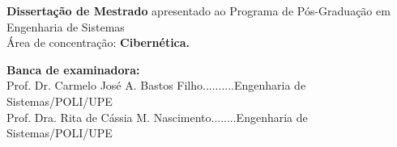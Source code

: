 \begin{center}
\begin{center}
\end{center}


\begin{flushright}
\vspace{0.5in}
\parbox{3.15in}
 {\textbf{Dissertação de Mestrado} apresentado ao Programa de Pós-Graduação em Engenharia de Sistemas\\
 Área de concentração: \textbf{Cibernética.} }
\end{flushright}



\vspace{0.5in}

\begin{flushleft}

\vspace{1ex} \textbf{Banca de examinadora:} \\

\vspace{1ex} Prof. Dr.  Carmelo José A. Bastos Filho..........Engenharia de Sistemas/POLI/UPE \\
\vspace{1ex} Prof. Dra. Rita de Cássia M. Nascimento........Engenharia de Sistemas/POLI/UPE

\end{flushleft}


\vspace{0.2in}
\dataQualif

\end{center}

